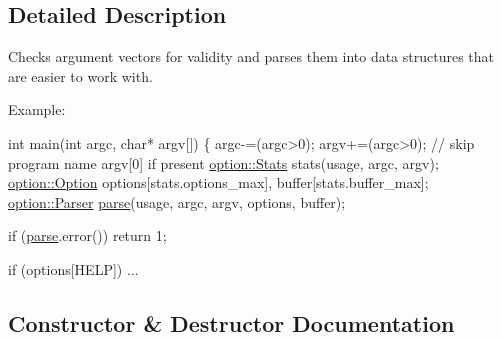 \subsection{Detailed Description}
Checks argument vectors for validity and parses them into data structures that are easier to work with. 

\begin{DoxyParagraph}{Example\+:}

\begin{DoxyCode}
\textcolor{keywordtype}{int} main(\textcolor{keywordtype}{int} argc, \textcolor{keywordtype}{char}* argv[])
\{
  argc-=(argc>0); argv+=(argc>0); \textcolor{comment}{// skip program name argv[0] if present}
  \hyperlink{structoption_1_1_stats}{option::Stats}  stats(usage, argc, argv);
  \hyperlink{classoption_1_1_option}{option::Option} options[stats.options\_max], buffer[stats.buffer\_max];
  \hyperlink{classoption_1_1_parser}{option::Parser} \hyperlink{classoption_1_1_parser_a6e0b5778d1cfbd6cd51240e74d01e138}{parse}(usage, argc, argv, options, buffer);

  \textcolor{keywordflow}{if} (\hyperlink{classoption_1_1_parser_a6e0b5778d1cfbd6cd51240e74d01e138}{parse}.error())
    \textcolor{keywordflow}{return} 1;

  \textcolor{keywordflow}{if} (options[HELP])
  ...
\end{DoxyCode}
 
\end{DoxyParagraph}


\subsection{Constructor \& Destructor Documentation}
\mbox{\label{classoption_1_1_parser_aa747e9792c9c08ede32b6c323438db71}} 
